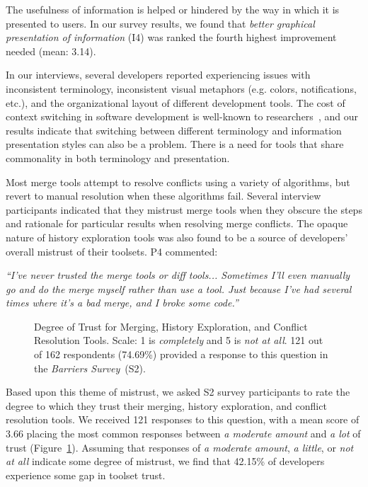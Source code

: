 The usefulness of information is helped or hindered by the way in which it is presented to users.
In our survey results, we found that \textit{better graphical presentation of information} (I4) was ranked the fourth highest improvement needed (mean: 3.14).

In our interviews, several developers reported experiencing issues with inconsistent terminology, inconsistent visual metaphors (e.g. colors, notifications, etc.), and the organizational layout of different development tools.
The cost of context switching in software development is well-known to researchers~\cite{czerwinski2004taskswitching, li2007cost_of_context_switch, blackwell2002attentioninvestment, convertino2003dualview}, and our results indicate that switching between different terminology and information presentation styles can also be a problem.
There is a need for tools that share commonality in both terminology and presentation. 

\label{tool_trust}
Most merge tools attempt to resolve conflicts using a variety of algorithms, but revert to manual resolution when these algorithms fail.
Several interview participants indicated that they mistrust merge tools when they obscure the steps and rationale for particular results when resolving merge conflicts.
The opaque nature of history exploration tools was also found to be a source of developers' overall mistrust of their toolsets.
P4 commented:
\begin{quoting}
\textit{``I've never trusted the merge tools or diff tools... Sometimes I'll even manually go and do the merge myself rather than use a tool. Just because I've had several times where it's a bad merge, and I broke some code.''}
\end{quoting}

\begin{figure}
	\centering
	\caption{Degree of Trust for Merging, History Exploration, and Conflict Resolution Tools. Scale: 1 is \textit{completely} and 5 is \textit{not at all}. 121 out of 162 respondents (74.69\%) provided a response to this question in the \textit{Barriers Survey}~(S2).}
	\label{fig:tool_trust}
\end{figure}

Based upon this theme of mistrust, we asked S2 survey participants to rate the degree to which they trust their merging, history exploration, and conflict resolution tools.
We received 121 responses to this question, with a mean score of 3.66 placing the most common responses between \textit{a moderate amount} and \textit{a lot} of trust (Figure~\ref{fig:tool_trust}).
Assuming that responses of \textit{a moderate amount}, \textit{a little}, or \textit{not at all} indicate some degree of mistrust, we find that 42.15\% of developers experience some gap in toolset trust.

